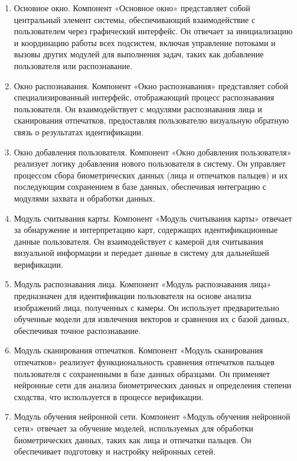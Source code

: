 \begin{enumerate}
	\item Основное окно. Компонент «Основное окно» представляет собой центральный элемент системы, обеспечивающий взаимодействие с пользователем через графический интерфейс. Он отвечает за инициализацию и координацию работы всех подсистем, включая управление потоками и вызовы других модулей для выполнения задач, таких как добавление пользователя или распознавание.
	\item Окно распознавания. Компонент «Окно распознавания» представляет собой специализированный интерфейс, отображающий процесс распознавания пользователя. Он взаимодействует с модулями распознавания лица и сканирования отпечатков, предоставляя пользователю визуальную обратную связь о результатах идентификации.
	\item Окно добавления пользователя. Компонент «Окно добавления пользователя» реализует логику добавления нового пользователя в систему. Он управляет процессом сбора биометрических данных (лица и отпечатков пальцев) и их последующим сохранением в базе данных, обеспечивая интеграцию с модулями захвата и обработки данных.
	\item Модуль считывания карты. Компонент «Модуль считывания карты» отвечает за обнаружение и интерпретацию карт, содержащих идентификационные данные пользователя. Он взаимодействует с камерой для считывания визуальной информации и передает данные в систему для дальнейшей верификации.
	\item Модуль распознавания лица. Компонент «Модуль распознавания лица» предназначен для идентификации пользователя на основе анализа изображений лица, полученных с камеры. Он использует предварительно обученные модели для извлечения векторов и сравнения их с базой данных, обеспечивая точное распознавание. 
	\item Модуль сканирования отпечатков. Компонент «Модуль сканирования отпечатков» реализует функциональность сравнения отпечатков пальцев пользователя с сохраненными в базе данных образцами. Он применяет нейронные сети для анализа биометрических данных и определения степени сходства, что используется в процессе верификации.
	\item Модуль обучения нейронной сети. Компонент «Модуль обучения нейронной сети» отвечает за обучение моделей, используемых для обработки биометрических данных, таких как лица и отпечатки пальцев. Он обеспечивает подготовку и настройку нейронных сетей.
\end{enumerate}

